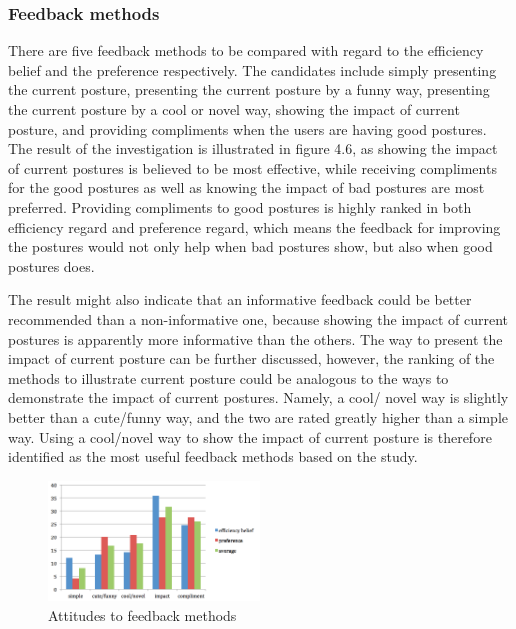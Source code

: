 \subsubsection{Feedback methods}

There are five feedback methods to be compared with regard to the efficiency belief and the preference respectively. The candidates include simply presenting the current posture, presenting the current posture by a funny way, presenting the current posture by a cool or novel way, showing the impact of current posture, and providing compliments when the users are having good postures. The result of the investigation is illustrated in figure 4.6, as showing the impact of current postures is believed to be most effective, while receiving compliments for the good postures as well as knowing the impact of bad postures are most preferred. Providing compliments to good postures is highly ranked in both efficiency regard and preference regard, which means the feedback for improving the postures would not only help when bad postures show, but also when good postures does.

The result might also indicate that an informative feedback could be better recommended than a non-informative one, because showing the impact of current postures is apparently more informative than the others. The way to present the impact of current posture can be further discussed, however, the ranking of the methods to illustrate current posture could be analogous to the ways to demonstrate the impact of current postures. Namely, a cool/ novel way is slightly better than a cute/funny way, and the two are rated greatly higher than a simple way. Using a cool/novel way to show the impact of current posture is therefore identified as the most useful feedback methods based on the study.

\begin{figure}[h]
\centering
  \includegraphics[width=0.5\textwidth]{figs/method}
\caption{Attitudes to feedback methods}
\end{figure}

